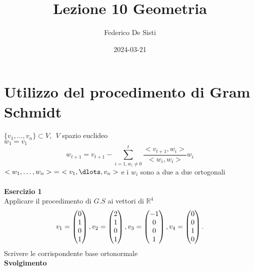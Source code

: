 \documentclass[12px]{article}
\title{Lezione 10 Geometria}
\date{2024-03-21}
\author{Federico De Sisti}
\begin{document}
	\maketitle
	\newpage
	\section{Utilizzo del procedimento di Gram Schmidt}
	$\{v_1,\ldots,v_n\}\subset V, \ \ V$ spazio euclideo \\
	$w_1 = v_1$ \\
	\[w_{t+1} = v_{t+1} - \sum^t_{i=1, w_i\neq 0}\frac{<v_{t+1},w_i>}{<w_i,w_i>}w_i\]
	$<w_1,\ldots,w_n> \  =  \ <v_1,\dlots,v_n>$
	e i $w_i$ sono a due a due ortogonali\\
	\hline \ \\
	\textbf{Esercizio 1} \\
	Applicare il procedimento di $G.S$ ai vettori di $\mathbb{R}^4$ \\
	\[
		v_1 = \begin{pmatrix}0\\1\\0\\1\end{pmatrix}, v_2 = \begin{pmatrix}2\\1\\0\\1\end{pmatrix}, v_3 = \begin{pmatrix}-1\\0\\0\\1\end{pmatrix}, v_4 = \begin{pmatrix}0\\0\\1\\0\end{pmatrix}
	.\] 
	Scrivere le corrispondente base ortonormale\\
	\textbf{Svolgimento}\\
\end{document}
